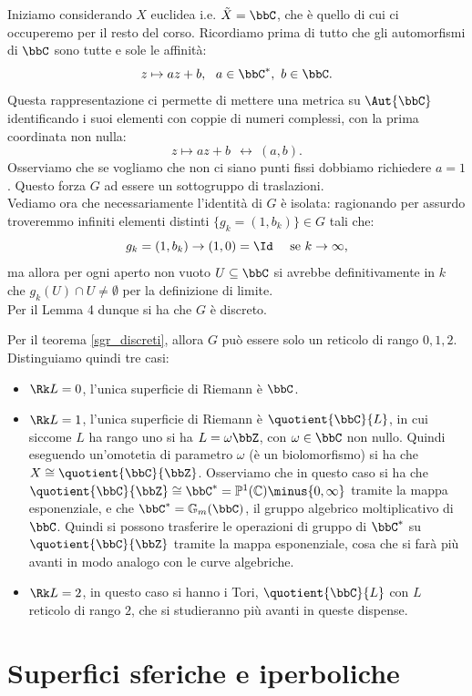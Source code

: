 Iniziamo considerando $X$ euclidea i.e. $\tilde{X}=\bbC$, che è quello di cui ci occuperemo per il resto del corso. Ricordiamo prima di tutto che gli automorfismi di $\bbC$ sono tutte e sole le affinità:
$$
z\mapsto az+b,\ \ a\in\bbC^*,\ b\in \bbC.
$$
Questa rappresentazione ci permette di mettere una metrica su $\Aut{\bbC}$ identificando i suoi elementi con coppie di numeri complessi, con la prima coordinata non nulla:
$$
z\mapsto az+b\ \ \leftrightarrow\  (a,b).
$$
Osserviamo che se vogliamo che non ci siano punti fissi dobbiamo richiedere $a=1$. Questo forza $G$ ad essere un sottogruppo di traslazioni.\\
Vediamo ora che necessariamente l'identità di $G$ è isolata: ragionando per assurdo troveremmo infiniti elementi distinti $\{ g_k=(1,b_k) \}\in G$ tali che:
$$
g_k=(1,b_k)\rightarrow (1,0)=\Id\ \ \ \mbox{ se } k \rightarrow \infty,
$$
ma allora per ogni aperto non vuoto $U\subseteq \bbC$ si avrebbe definitivamente in $k$ che $g_k(U)\cap U\neq \emptyset$ per la definizione di limite.\\
Per il Lemma 4 dunque si ha che $G$ è discreto.

Per il teorema \ref{sgr_discreti}, allora $G$ può essere solo un reticolo di rango $0,1,2$. Distinguiamo quindi tre casi:
\begin{itemize}
\item $\Rk L=0$, l'unica superficie di Riemann è $\bbC$.
\item $\Rk L=1$, l'unica superficie di Riemann è $\quotient{\bbC}{L}$, in cui siccome $L$ ha rango uno si ha $L=\omega \bbZ$, con $\omega\in\bbC$ non nullo. Quindi eseguendo un'omotetia di parametro $\omega$ (è un biolomorfismo) si ha che $X\cong \quotient{\bbC}{\bbZ}$.
Osserviamo che in questo caso si ha che $\quotient{\bbC}{\bbZ}\cong \bbC^{*}=\mathbb{P}^1(\mathbb{C})\minus\{0,\infty\}$ tramite la mappa esponenziale, e che $\bbC^{*}=\mathbb{G}_m(\bbC)$, il gruppo algebrico moltiplicativo di $\bbC$. Quindi si possono trasferire le operazioni di gruppo di $\bbC^{*}$ su $\quotient{\bbC}{\bbZ}$ tramite la mappa esponenziale, cosa che si farà più avanti in modo analogo con le curve algebriche.
\item $\Rk L=2$, in questo caso si hanno i Tori, $\quotient{\bbC}{L}$ con $L$ reticolo di rango $2$, che si studieranno più avanti in queste dispense.
\end{itemize}


\section{Superfici sferiche e iperboliche}

